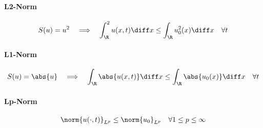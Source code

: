 \paragraph{L2-Norm}
\begin{propertybox}\nospacing
    \begin{property}[L2-Norm]\label{property:l2-norm_entropy_solution}
       \begin{align}
         S(u)=u^{2}&&\implies&&
         \int_{\R}^{2}u(x,t)\diff x\leq
                 \int_{\R}u_{0}^{2}(x)\diff x&&\forall t
       \end{align}
    \end{property}
\end{propertybox}
\paragraph{L1-Norm}
\begin{propertybox}\nospacing
    \begin{property}[L1-Norm]\label{property:l1-norm_entropy_solution}
       \begin{align}
         S(u)=\abs{u}&&\implies&&
         \int_{\R}\abs{u(x,t)}\diff x\leq
                 \int_{\R}\abs{u_{0}(x)}\diff x&&\forall t
       \end{align}
    \end{property}
\end{propertybox}
\paragraph{Lp-Norm}
\begin{propertybox}\nospacing
    \begin{property}[Lp-Norm]\label{property:lp-norm_entropy_solution}
       \begin{align}
         \norm{u(\cdot,t)}_{L^{p}}\leq\norm{u_{0}}_{L^{p}}&&\forall1\leq p\leq\infty
       \end{align}
    \end{property}
\end{propertybox}
